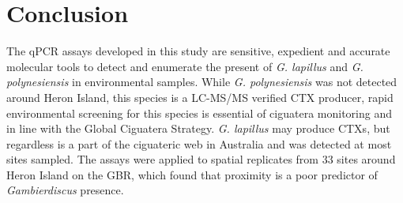 \documentclass[12pt]{article}
\begin{document}
\section*{Conclusion}
The qPCR assays developed in this study are sensitive, expedient and accurate molecular tools to detect and enumerate the present of \emph{G. lapillus} and \emph{G. polynesiensis} in environmental samples.
While \emph{G. polynesiensis} was not detected around Heron Island, this species is a LC-MS/MS verified CTX producer, rapid environmental screening for this species is essential of ciguatera monitoring and in line with the Global Ciguatera Strategy. \emph{G. lapillus} may produce CTXs, but regardless is a part of the ciguateric web in Australia and was detected at most sites sampled.
The assays were applied to spatial replicates from 33 sites around Heron Island on the GBR, which found that proximity is a poor predictor of \textit{Gambierdiscus} presence.
\end{document}
